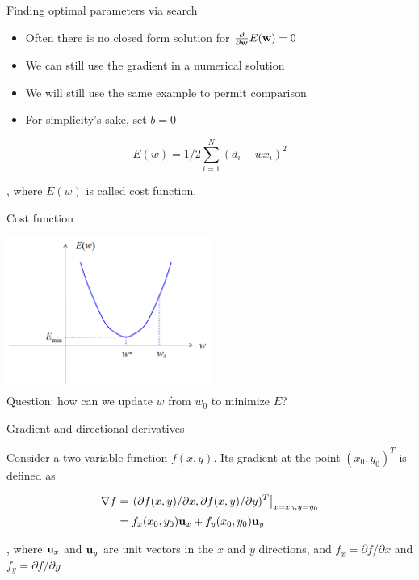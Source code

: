 \documentclass[notes]{beamer}
\providecommand{\tightlist}{%
  \setlength{\itemsep}{0pt}\setlength{\parskip}{0pt}}
\begin{document}
\begin{frame}{Finding optimal parameters via search}

\begin{itemize}
\tightlist
\item
  Often there is no closed form solution for
  \(\frac{\partial}{\partial \mathbf{w}} E(\mathbf{w})=0\)
\item
  We can still use the gradient in a numerical solution
\item
  We will still use the same example to permit comparison
\item
  For simplicity's sake, set \(b = 0\)
\end{itemize}

\[E(w) = 1/2 \sum_{i=1}^{N} (d_i - wx_i)^2\]

, where \(E(w)\) is called cost function.

\end{frame}

\begin{frame}{Cost function}

\centering 

\includegraphics[width=0.50000\textwidth]{2018-03-09-22-15-39.png}\\

Question: how can we update \(w\) from \(w_0\) to minimize \(E\)?

\end{frame}

\begin{frame}{Gradient and directional derivatives}

Consider a two-variable function \(f(x,y)\). Its gradient at the point
\((x_0 ,y_0)^T\) is defined as

\begin{equation*}
    \begin{aligned}
        \nabla f & = \left. (\partial f(x,y) / \partial x , \partial f(x,y) / \partial y)^T \right|_{x=x_0,y=y_0}   \\ 
        & = f_x(x_0,y_0) \mathbf{u}_x + f_y(x_0,y_0) \mathbf{u}_y 
    \end{aligned}
\end{equation*}

, where \(\mathbf{u}_x\) and \(\mathbf{u}_y\) are unit vectors in the \(x\) and \(y\)
directions, and \(f_x=\partial f / \partial x\) and
\(f_y = \partial f / \partial y\)

\end{frame}
\end{document}
